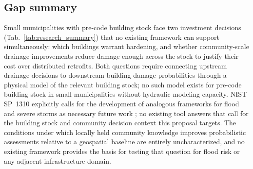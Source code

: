 \documentclass[11pt]{article}
\begin{document}
\subsection{Gap summary}
Small municipalities with pre-code building stock face two investment decisions
(Tab.~\ref{tab:research_summary}) that no existing framework can support
simultaneously: which buildings warrant hardening, and whether community-scale
drainage improvements reduce damage enough across the stock to justify their cost
over distributed retrofits.
Both questions require connecting upstream drainage decisions to downstream building
damage probabilities through a physical model of the relevant building stock; no
such model exists for pre-code building stock in small municipalities without
hydraulic modeling capacity.
NIST SP~1310 \cite{davis2024nist} explicitly calls for the development of analogous
frameworks for flood and severe storms as necessary future work
\cite[Sec.~6.1.2]{davis2024nist}; no existing tool answers that call for the
building stock and community decision context this proposal targets.
The conditions under which locally held community knowledge improves probabilistic
assessments relative to a geospatial baseline are entirely uncharacterized, and no
existing framework provides the basis for testing that question for flood risk or
any adjacent infrastructure domain.

\end{document}
